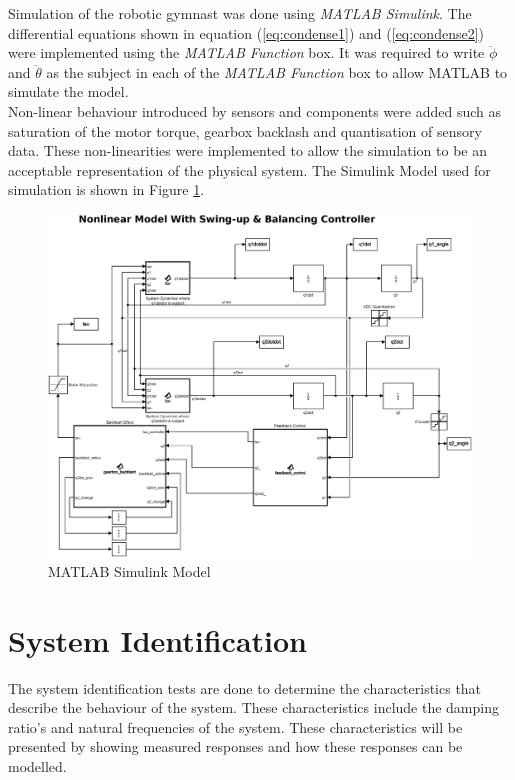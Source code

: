 Simulation of the robotic gymnast was done using \textit{MATLAB Simulink}. The differential equations shown in equation (\ref{eq:condense1}) and (\ref{eq:condense2}) were implemented using the \textit{MATLAB Function} box. It was required to write $\ddot{\phi}$ and $\ddot{\theta}$ as the subject in each of the \textit{MATLAB Function} box to allow MATLAB to simulate the model.\\

Non-linear behaviour introduced by sensors and components were added such as saturation of the motor torque, gearbox backlash and quantisation of sensory data. These non-linearities were implemented to allow the simulation to be an acceptable representation of the physical system. The Simulink Model used for simulation is shown in Figure \ref{fig:sim_nonlinearfeedback}.

\begin{figure}[h]
	\centering
	\includegraphics[scale=0.3]{./figs/simulink/latex_simulink.eps}
	\caption{MATLAB Simulink Model}
	\label{fig:sim_nonlinearfeedback}
\end{figure}

\section{System Identification}
\label{sec:system_identification}

The system identification tests are done to determine the characteristics that describe the behaviour of the system. These characteristics include the damping ratio's and natural frequencies of the system. These characteristics will be presented by showing measured responses and how these responses can be modelled. \\

